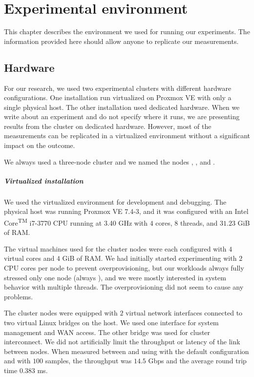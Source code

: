 \chapter{Experimental environment}
\label{chap:env}

This chapter describes the environment we used for running our experiments. The information provided here should allow anyone to replicate our measurements.

\section{Hardware}
\label{sec:hw-env}

For our research, we used two experimental clusters with different hardware configurations. One installation run virtualized on Proxmox VE with only a single physical host. The other installation used dedicated hardware. When we write about an experiment and do not specify where it runs, we are presenting results from the cluster on dedicated hardware. However, most of the measurements can be replicated in a virtualized environment without a significant impact on the outcome.

We always used a three-node cluster and we named the nodes , , and .

\paragraph{Virtualized installation}
We used the virtualized environment for development and debugging. The physical host was running Proxmox VE 7.4-3, and it was configured with an Intel\textsuperscript{\textregistered} Core\textsuperscript{TM} i7-3770 CPU running at 3.40 GHz with $4$ cores, $8$ threads, and $31.23$ GiB of RAM.

The virtual machines used for the cluster nodes were each configured with $4$ virtual cores and $4$ GiB of RAM. We had initially started experimenting with $2$ CPU cores per node to prevent overprovisioning, but our workloads always fully stressed only one node (always ), and we were mostly interested in system behavior with multiple threads. The overprovisioning did not seem to cause any problems.

The cluster nodes were equipped with $2$ virtual network interfaces connected to two virtual Linux bridges on the host. We used one interface for system management and WAN access. The other bridge was used for cluster interconnect. We did not artificially limit the throughput or latency of the link between nodes. When measured between  and  using  with the default configuration and  with $100$ samples, the throughput was $14.5$ Gbps and the average round trip time $0.383$ ms.

